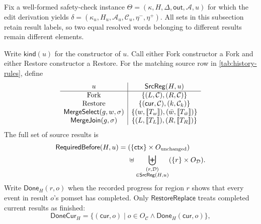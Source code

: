 Fix a well-formed safety-check instance \(\Theta=(\kappa,H,\Delta,\mathsf{out},\mathcal A,u)\) for which the edit derivation yields \(\delta=(\kappa_u,H_u,\mathcal A_u,\mathcal C_u,\eta^-,\eta^+)\).
All sets in this subsection retain result labels, so two equal resolved words belonging to different results remain different elements.
\begin{definition}
\label{def:source-results}
Write \(\mathsf{kind}(u)\) for the constructor of \(u\).
Call either Fork constructor a Fork and either Restore constructor a Restore.
For the matching source row in \cref{tab:history-rules}, define
\[
\begin{array}{c|c}
u&\mathsf{SrcReg}(H,u)\\ \hline
\text{Fork}&\{(L,\mathcal C),(R,\mathcal C)\}\\
\text{Restore}&\{(\mathsf{cur},\mathcal C),(k,\mathcal C_k)\}\\
\mathsf{MergeSelect}(g,w,\sigma)&
 \{(w,\sem{T_w}),(\bar w,\sem{T_{\bar w}})\}\\
\mathsf{MergeJoin}(g,\sigma)&
 \{(L,\sem{T_L}),(R,\sem{T_R})\}
\end{array}
\]
The full set of source results is
\[
\begin{aligned}
\mathsf{RequiredBefore}(H,u)
={}&(\{\mathsf{ctx}\}\times O_{\rm unchanged})\\
&\uplus
\biguplus_{\substack{(r,\mathcal D)\\
\in\mathsf{SrcReg}(H,u)}}(\{r\}\times O_{\mathcal D}).
\end{aligned}
\]
Write \(\mathsf{Done}_H(r,o)\) when the recorded progress for region \(r\) shows that every event in result \(o\)'s pomset has completed.
Only \(\mathsf{RestoreReplace}\) treats completed current results as finished:
\[
\mathsf{DoneCur}_H=
\{(\mathsf{cur},o)\mid
o\in O_{\mathcal C}\land\mathsf{Done}_H(\mathsf{cur},o)\},
\]
\[
\begin{array}{c|c}

\end{array}\]
\end{definition}
